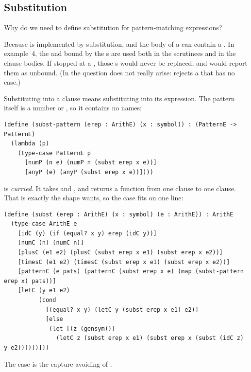 \subsection{Substitution}

\begin{exercise}
Why do we need to define substitution for pattern-matching expressions?
\end{exercise}
\begin{solution}
Because  is implemented by substitution, and the body of a  can contain a . In example~4, the  and  bound by the s are used both in the scrutinees and in the clause bodies. If  stopped at a , those s would never be replaced, and  would report them as unbound. (In  the question does not really arise:  rejects a  that has no  case.)
\end{solution}

Substituting into a clause means substituting into its expression. The pattern itself is a number or \code{\_}, so it contains no names:
\begin{lstlisting}
(define (subst-pattern (erep : ArithE) (x : symbol)) : (PatternE -> PatternE)
  (lambda (p)
    (type-case PatternE p
      [numP (n e) (numP n (subst erep x e))]
      [anyP (e) (anyP (subst erep x e))])))
\end{lstlisting}
 is \emph{curried}. It takes  and , and returns a function from one clause to one clause. That is exactly the shape  wants, so the  case fits on one line:
\begin{lstlisting}
(define (subst (erep : ArithE) (x : symbol) (e : ArithE)) : ArithE
  (type-case ArithE e
    [idC (y) (if (equal? x y) erep (idC y))]
    [numC (n) (numC n)]
    [plusC (e1 e2) (plusC (subst erep x e1) (subst erep x e2))]
    [timesC (e1 e2) (timesC (subst erep x e1) (subst erep x e2))]
    [patternC (e pats) (patternC (subst erep x e) (map (subst-pattern erep x) pats))]
    [letC (y e1 e2)
          (cond
            [(equal? x y) (letC y (subst erep x e1) e2)]
            [else
             (let [(z (gensym))]
               (letC z (subst erep x e1) (subst erep x (subst (idC z) y e2))))])]))
\end{lstlisting}
The  case is the capture-avoiding  of .

